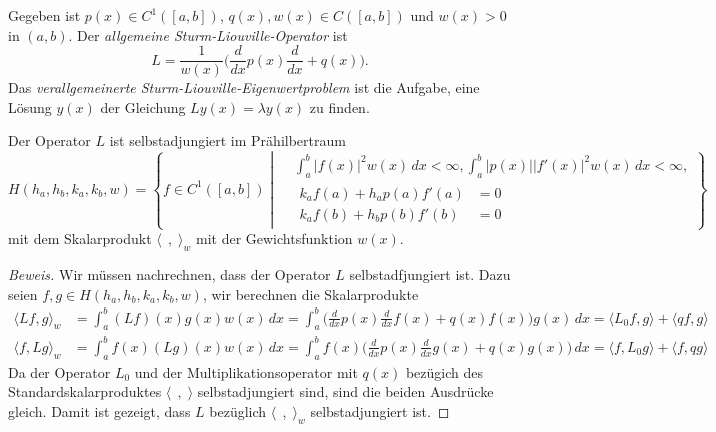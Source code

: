 \begin{definition}
Gegeben ist $p(x)\in C^1([a,b])$, $q(x),w(x)\in C([a,b])$ und $w(x)>0$
in $(a,b)$.
Der {\em allgemeine Sturm-Liouville-Operator} ist
\[
L
=
\frac{1}{w(x)}
\biggl(
\frac{d}{dx}p(x)\frac{d}{dx}
+
q(x)
\biggr).
\]
Das {\em verallgemeinerte Sturm-Liouville-Eigenwertproblem} ist die Aufgabe,
eine Lösung $y(x)$ der Gleichung
\(
Ly(x) = \lambda y(x)
\)
zu finden.
\end{definition}

\begin{satz}
Der Operator $L$ ist selbstadjungiert im Prähilbertraum
\[
H(h_a,h_b,k_a,k_b,w)
=
\left\{
f \in C^1([a,b])
\;
\left|
\;
\begin{aligned}
&\int_a^b |f(x)|^2w(x)\,dx < \infty,
\int_a^b |p(x)| |f'(x)|^2w(x)\,dx < \infty,
\\
&
\begin{aligned}
k_af(a) + h_ap(a)f'(a) &= 0 \\
k_af(b) + h_bp(b)f'(b) &= 0 
\end{aligned}
\end{aligned}
\right.
\right\}
\]
mit dem Skalarprodukt $\langle \;\,,\;\rangle_w$ mit der Gewichtsfunktion
$w(x)$.
\end{satz}

\begin{proof}[Beweis]
Wir müssen nachrechnen, dass der Operator $L$ selbstadfjungiert ist.
Dazu seien $f,g\in H(h_a,h_b,k_a,k_b,w)$, wir berechnen die
Skalarprodukte
\begin{align*}
\langle Lf,g\rangle_w
&=
\int_a^b (Lf)(x)g(x)w(x)\,dx
=
\int_a^b
\biggl(
\frac{d}{dx}p(x)\frac{d}{dx}f(x) + 
q(x) f(x)
\biggr) g(x)\,dx
=
\langle L_0f,g\rangle + \langle qf,g\rangle
\\
\langle f,Lg\rangle_w
&=
\int_a^b f(x)(Lg)(x)w(x)\,dx
=
\int_a^b
f(x)
\biggl(
\frac{d}{dx}p(x)\frac{d}{dx}g(x) + 
q(x) g(x)
\biggr) \,dx
=
\langle f,L_0g\rangle + \langle f,qg\rangle
\end{align*}
Da der Operator $L_0$ und der Multiplikationsoperator mit $q(x)$ bezügich
des Standardskalarproduktes $\langle\;\,,\;\rangle$ selbstadjungiert sind,
sind die beiden Ausdrücke gleich.
Damit ist gezeigt, dass $L$ bezüglich $\langle\;\,,\;\rangle_w$
selbstadjungiert ist.
\end{proof}
